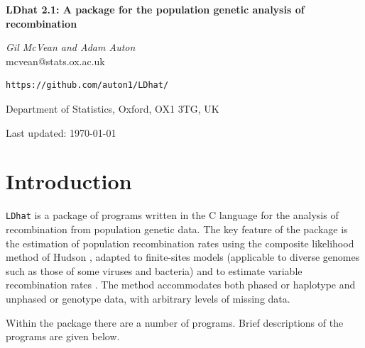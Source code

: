 \documentclass[a4paper,10pt,fullpage]{article}
\begin{document}
\begin{titlepage}

\flushleft

{\Large \bf LDhat 2.1: A package for the population genetic analysis
of recombination\\}

\vspace{1.5cm} {\it Gil McVean and Adam Auton\\}
mcvean@stats.ox.ac.uk\\
\begin{verbatim}
https://github.com/auton1/LDhat/
\end{verbatim}

\vspace{0.75cm}
Department of Statistics, Oxford, OX1 3TG, UK\\
\vspace{5.0cm}

Last updated: \today

\end{titlepage}

\tableofcontents

\newpage

\section{Introduction}
\verb+LDhat+ is a package of programs written in the C language for the
analysis of recombination from population genetic data.  The key
feature of the package is the estimation of population
recombination rates using the composite likelihood method of
Hudson \cite{Hudson01}, adapted to finite-sites models (applicable
to diverse genomes such as those of some viruses and bacteria)
\cite{McVeanetal02} and to estimate variable recombination rates
\cite{McVeanetal04, AutonMcVean07}. The method accommodates both phased or
haplotype and unphased or genotype data, with arbitrary levels of
missing data.

Within the package there are a number of programs.  Brief
descriptions of the programs are given below.
\end{document}
